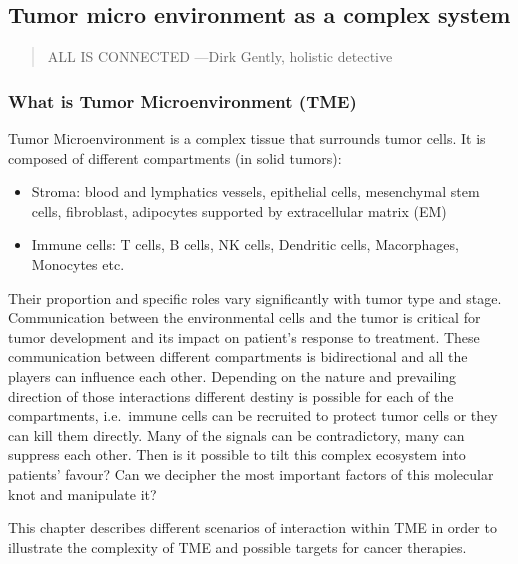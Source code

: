 \documentclass[12pt,]{book}
\providecommand{\tightlist}{%
  \setlength{\itemsep}{0pt}\setlength{\parskip}{0pt}}
\theoremstyle{definition}
\theoremstyle{definition}
\theoremstyle{definition}
\theoremstyle{remark}
\begin{document}
\hypertarget{tumor-micro-environment-as-a-complex-system}{%
\subsection{Tumor micro environment as a complex
system}\label{tumor-micro-environment-as-a-complex-system}}

\begin{quote}
ALL IS CONNECTED ---Dirk Gently, holistic detective
\end{quote}

\hypertarget{what-is-tumor-microenvironment-tme}{%
\subsubsection{What is Tumor Microenvironment
(TME)}\label{what-is-tumor-microenvironment-tme}}

Tumor Microenvironment is a complex tissue that surrounds tumor cells.
It is composed of different compartments (in solid tumors):

\begin{itemize}
\tightlist
\item
  Stroma: blood and lymphatics vessels, epithelial cells, mesenchymal
  stem cells, fibroblast, adipocytes supported by extracellular matrix
  (EM)
\item
  Immune cells: T cells, B cells, NK cells, Dendritic cells,
  Macorphages, Monocytes etc.
\end{itemize}

Their proportion and specific roles vary significantly with tumor type
and stage. Communication between the environmental cells and the tumor
is critical for tumor development and its impact on patient's response
to treatment. These communication between different compartments is
bidirectional and all the players can influence each other. Depending on
the nature and prevailing direction of those interactions different
destiny is possible for each of the compartments, i.e.~immune cells can
be recruited to protect tumor cells or they can kill them directly. Many
of the signals can be contradictory, many can suppress each other. Then
is it possible to tilt this complex ecosystem into patients' favour? Can
we decipher the most important factors of this molecular knot and
manipulate it?

This chapter describes different scenarios of interaction within TME in
order to illustrate the complexity of TME and possible targets for
cancer therapies.
\end{document}
